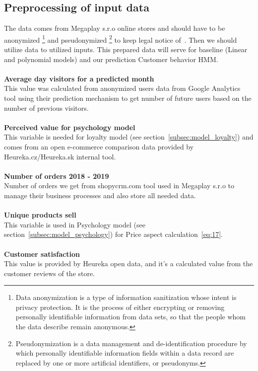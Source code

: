 \subsection{Preprocessing of input data} \label{sec:preprocessing}
The data comes from Megaplay s.r.o online stores and should have to be\\ anonymized \footnote{Data anonymization is a type of information sanitization whose intent is privacy protection.
It is the process of either encrypting or removing personally identifiable information from data sets, so that
the people whom the data describe remain anonymous.} and pseudonymized \footnote{Pseudonymization is a data management
and de-identification procedure by which personally identifiable information fields within a data record are replaced
by one or more artificial identifiers, or pseudonyms.} to keep legal notice of~\cite{gdpr}.
Then we should utilize data to utilized inputs.
This prepared data will serve for baseline (Linear and polynomial models) and our prediction Customer behavior HMM.\\
\\
\textbf{Average day visitors for a predicted month}\\
This value was calculated from anonymized users data from Google Analytics tool using their prediction mechanism to get number of future users based on the number of previous visitors.\\
\\
\textbf{Perceived value for psychology model} \label{perceived}\\
This variable is needed for loyalty model (see section~\ref{subsec:model_loyalty}) and comes from an open e-commerce comparison data provided by Heureka.cz/Heureka.sk internal tool.\\
\\
\textbf{Number of orders 2018 - 2019}\\
Number of orders we get from shopycrm.com tool used in Megaplay s.r.o to manage their business processes and also store all needed data.\\
\\
\textbf{Unique products sell}\\
This variable is used in Psychology model (see section~\ref{subsec:model_psychology}) for Price aspect calculation~\ref{eq:17}.\\
\\
\textbf{Customer satisfaction} \label{customerSat}\\
This value is provided by Heureka open data, and it's a calculated value from the customer reviews of the store.\\
